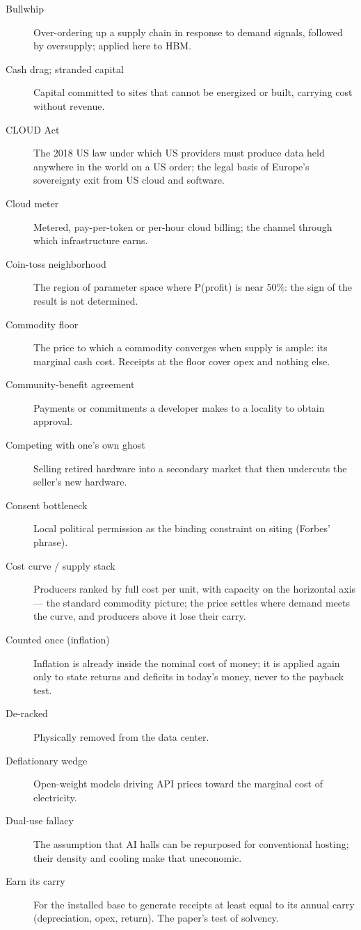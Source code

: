 \documentclass[11pt,letterpaper]{article}
\begin{document}
\begin{description}
\item[Bullwhip] Over-ordering up a supply chain in response to demand signals, followed by oversupply; applied here to HBM.
\item[Cash drag; stranded capital] Capital committed to sites that cannot be energized or built, carrying cost without revenue.
\item[CLOUD Act] The 2018 US law under which US providers must produce data held anywhere in the world on a US order; the legal basis of Europe's sovereignty exit from US cloud and software.
\item[Cloud meter] Metered, pay-per-token or per-hour cloud billing; the channel through which infrastructure earns.
\item[Coin-toss neighborhood] The region of parameter space where P(profit) is near 50\%: the sign of the result is not determined.
\item[Commodity floor] The price to which a commodity converges when supply is ample: its marginal cash cost. Receipts at the floor cover opex and nothing else.
\item[Community-benefit agreement] Payments or commitments a developer makes to a locality to obtain approval.
\item[Competing with one's own ghost] Selling retired hardware into a secondary market that then undercuts the seller's new hardware.
\item[Consent bottleneck] Local political permission as the binding constraint on siting (Forbes' phrase).
\item[Cost curve / supply stack] Producers ranked by full cost per unit, with capacity on the horizontal axis --- the standard commodity picture; the price settles where demand meets the curve, and producers above it lose their carry.
\item[Counted once (inflation)] Inflation is already inside the nominal cost of money; it is applied again only to state returns and deficits in today's money, never to the payback test.
\item[De-racked] Physically removed from the data center.
\item[Deflationary wedge] Open-weight models driving API prices toward the marginal cost of electricity.
\item[Dual-use fallacy] The assumption that AI halls can be repurposed for conventional hosting; their density and cooling make that uneconomic.
\item[Earn its carry] For the installed base to generate receipts at least equal to its annual carry (depreciation, opex, return). The paper's test of solvency.

\end{description}
\end{document}
